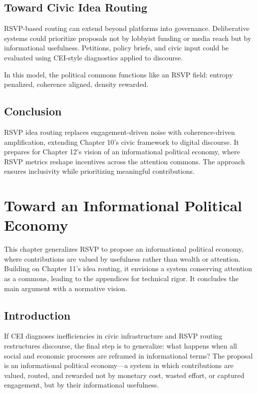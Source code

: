 \documentclass{book}
\begin{document}
\section{Toward Civic Idea Routing}

RSVP-based routing can extend beyond platforms into governance. Deliberative systems could prioritize proposals not by lobbyist funding or media reach but by informational usefulness. Petitions, policy briefs, and civic input could be evaluated using CEI-style diagnostics applied to discourse.

In this model, the political commons functions like an RSVP field: entropy penalized, coherence aligned, density rewarded.

\section{Conclusion}

RSVP idea routing replaces engagement-driven noise with coherence-driven amplification, extending Chapter 10’s civic framework to digital discourse. It prepares for Chapter 12’s vision of an informational political economy, where RSVP metrics reshape incentives across the attention commons. The approach ensures inclusivity while prioritizing meaningful contributions.

\chapter{Toward an Informational Political Economy}

This chapter generalizes RSVP to propose an informational political economy, where contributions are valued by usefulness rather than wealth or attention. Building on Chapter 11’s idea routing, it envisions a system conserving attention as a commons, leading to the appendices for technical rigor. It concludes the main argument with a normative vision.

\section{Introduction}

If CEI diagnoses inefficiencies in civic infrastructure and RSVP routing restructures discourse, the final step is to generalize: what happens when all social and economic processes are reframed in informational terms? The proposal is an informational political economy—a system in which contributions are valued, routed, and rewarded not by monetary cost, wasted effort, or captured engagement, but by their informational usefulness.
\end{document}
